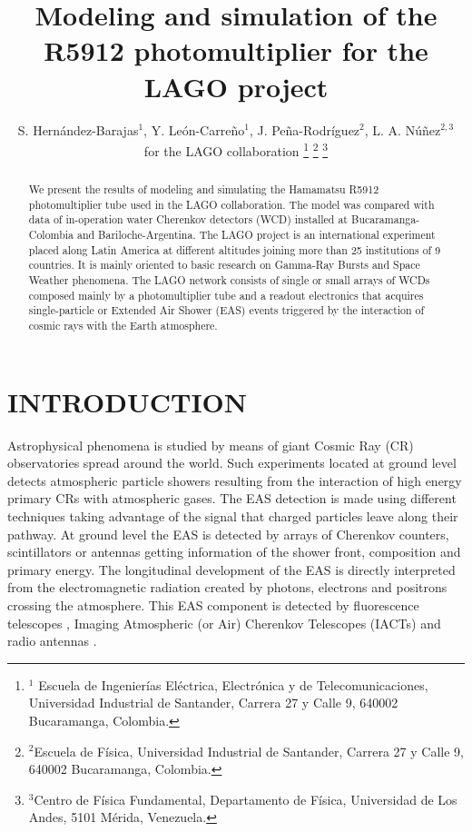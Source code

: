 \documentclass[letterpaper, 10 pt, conference]{ieeeconf}  %
\title{\LARGE \bf
Modeling and simulation of the R5912 photomultiplier for the LAGO project
}
\author{S. Hern\'andez-Barajas$^{1}$, Y. Le\'on-Carre\~no$^{1}$, J. Pe\~na-Rodr\'iguez$^{2}$, L. A. N\'u\~nez$^{2,3}$\\ for the LAGO collaboration%
\thanks{$^{1}$ Escuela de Ingenierías El\'ectrica, Electr\'onica y de Telecomunicaciones, Universidad Industrial de Santander, Carrera 27 y Calle 9, 640002 Bucaramanga, Colombia.
}
\thanks{$^{2}$Escuela de F\'isica, Universidad Industrial de Santander, Carrera 27 y Calle 9, 640002 Bucaramanga, Colombia.}
\thanks{$^{3}$Centro de F\'isica Fundamental, Departamento de F\'isica, Universidad de Los Andes, 5101 M\'erida, Venezuela.}
}
\begin{document}
\maketitle
\thispagestyle{empty}
\pagestyle{empty}



\begin{abstract}
We present the results of modeling and simulating the Hamamatsu R5912 photomultiplier tube used in the LAGO collaboration. The model was compared with data of in-operation water Cherenkov detectors (WCD) installed at Bucaramanga-Colombia and Bariloche-Argentina. The LAGO project is an international experiment placed along Latin America at different altitudes joining more than 25 institutions of 9 countries. It is mainly oriented to basic research on Gamma-Ray Bursts and Space Weather phenomena. The LAGO network consists of single or small arrays of WCDs composed mainly by a photomultiplier tube and a readout electronics that acquires single-particle or Extended Air Shower (EAS) events triggered by the interaction of cosmic rays with the Earth atmosphere. 
\end{abstract}


\section{INTRODUCTION}

Astrophysical phenomena is studied by means of giant Cosmic Ray (CR) observatories spread around the world. Such experiments located at ground level detects atmospheric particle showers resulting from the interaction of high energy primary CRs with atmospheric gases. The EAS detection is made using different techniques taking advantage of the signal that charged particles leave along their pathway. At ground level the EAS is detected by arrays of Cherenkov counters, scintillators or antennas getting information of the shower front, composition and primary energy. The longitudinal development of the EAS is directly interpreted from the electromagnetic radiation created by photons, electrons and positrons crossing the atmosphere. This EAS component is detected by fluorescence telescopes \cite{Neesal2011}, Imaging Atmospheric (or Air) Cherenkov Telescopes (IACTs) \cite{Schoorlemmer2019} and radio antennas \cite{Aab2016, Schrder2016}.
\end{document}
